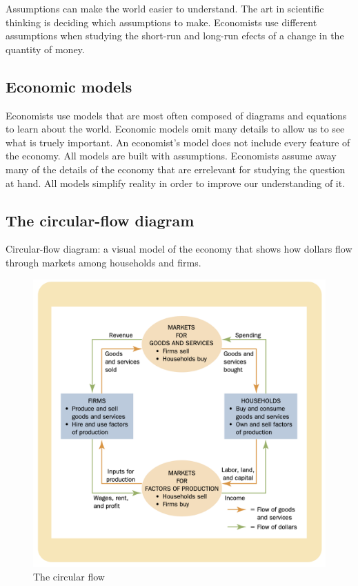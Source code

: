 Assumptions can make the world easier to understand.
The art in scientific thinking is deciding which assumptions to make.
Economists use different assumptions when studying the short-run and long-run efects of a change in the quantity of money.

\subsection{Economic models}

Economists use models that are most often composed of diagrams and equations to learn about the world.
Economic models omit many details to allow us to see what is truely important.
An economist's model does not include every feature of the economy.
All models are built with assumptions.
Economists assume away many of the details of the economy that are errelevant for studying the question at hand.
All models simplify reality in order to improve our understanding of it.

\subsection{The circular-flow diagram}

Circular-flow diagram: a visual model of the economy that shows how dollars flow through markets among households and firms.


\begin{figure}[!ht]
  \centering
  \includegraphics[width=\textwidth]{pics/circular-flow.png}
  \caption{The circular flow}
  \label{fig:circular-flow}
\end{figure}


